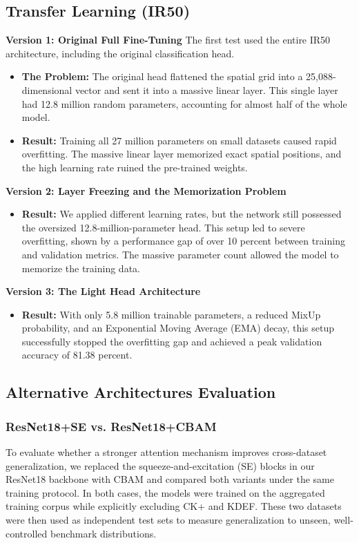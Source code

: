 \subsection{Transfer Learning (IR50)}

\textbf{Version 1: Original Full Fine-Tuning}
The first test used the entire IR50 architecture, including the original classification head.
\begin{itemize}
    \item \textbf{The Problem:} The original head flattened the spatial grid into a 25,088-dimensional vector and sent it into a massive linear layer. This single layer had 12.8 million random parameters, accounting for almost half of the whole model.
    \item \textbf{Result:} Training all 27 million parameters on small datasets caused rapid overfitting. The massive linear layer memorized exact spatial positions, and the high learning rate ruined the pre-trained weights.
\end{itemize}

\textbf{Version 2: Layer Freezing and the Memorization Problem}
\begin{itemize}
    \item \textbf{Result:} We applied different learning rates, but the network still possessed the oversized 12.8-million-parameter head. This setup led to severe overfitting, shown by a performance gap of over 10 percent between training and validation metrics. The massive parameter count allowed the model to memorize the training data.
\end{itemize}

\textbf{Version 3: The Light Head Architecture}
\begin{itemize}
    \item \textbf{Result:} With only 5.8 million trainable parameters, a reduced MixUp probability, and an Exponential Moving Average (EMA) decay, this setup successfully stopped the overfitting gap and achieved a peak validation accuracy of 81.38 percent.
\end{itemize}

\subsection{Alternative Architectures Evaluation}

\subsubsection{ResNet18+SE vs. ResNet18+CBAM}
To evaluate whether a stronger attention mechanism improves cross-dataset generalization, we replaced the squeeze-and-excitation (SE) blocks in our ResNet18 backbone with CBAM and compared both variants under the same training protocol. In both cases, the models were trained on the aggregated training corpus while explicitly excluding CK+ and KDEF. These two datasets were then used as independent test sets to measure generalization to unseen, well-controlled benchmark distributions.

